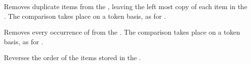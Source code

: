 \documentclass[oneside]{book}
\begin{document}
\begin{function}{\SeqVarRemoveDuplicates}
\begin{syntax}
 
\end{syntax}
Removes duplicate items from the , leaving the
left most copy of each item in the .  The 
comparison takes place on a token basis, as for .
\begin{demohigh}
\SeqSetFromClist {}
\SeqVarRemoveDuplicates \lTmpaSeq
\SeqVarJoin \lTmpaSeq {,}
\end{demohigh}
\end{function}

\begin{function}{\SeqVarRemoveAll}
\begin{syntax}
  
\end{syntax}
Removes every occurrence of  from the .
The  comparison takes place on a token basis, as for .
\begin{demohigh}
\SeqSetFromClist {}
\SeqVarRemoveAll {}
\SeqVarJoin \lTmpaSeq {,}
\end{demohigh}
\end{function}

\begin{function}{\SeqVarReverse}
\begin{syntax}
 
\end{syntax}
Reverses the order of the items stored in the .
\begin{demohigh}
\SeqSetFromClist {}
\SeqVarReverse \lTmpaSeq
\SeqVarJoin \lTmpaSeq {,}
\end{demohigh}
\end{function}

\end{document}
